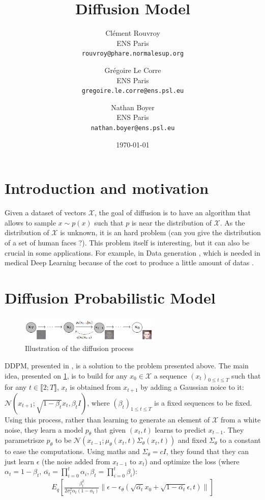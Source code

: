 \documentclass[a4paper,11pt]{article}
\title{Diffusion Model}
\author{Clément Rouvroy\\
        \small{ENS Paris}\\
        \small{\texttt{rouvroy@phare.normalesup.org}} \and
        Grégoire Le Corre\\
        \small{ENS Paris}\\
        \small{\texttt{gregoire.le.corre@ens.psl.eu}} \and
        Nathan Boyer\\
        \small{ENS Paris}\\
        \small{\texttt{nathan.boyer@ens.psl.eu}}}
\date{\today}
\begin{document}
\maketitle

\section{Introduction and motivation}

Given a dataset of vectors $\mathcal{X}$, the goal of diffusion is to have an algorithm that allows to sample $x \sim p(x)$ such that $p$  is near the distribution of $\mathcal{X}$. As the distribution of $\mathcal{X}$ is unknown, it is an hard problem (can you give the distribution of a set of human faces ?). This problem itself is interesting, but it can also be crucial in some applications. For example, in Data generation \cite{trabucco2023effectivedataaugmentationdiffusion}, which is needed in medical Deep Learning because of the cost to produce a little amount of datas \cite{tormos2024dataaugmentationdiffusionmodels}.


\section{Diffusion Probabilistic Model}

\begin{figure}[h]
    \centering
    \includegraphics[width=0.6\textwidth]{imgs/ho_diffusion_process.png}
    \caption{Illustration of the diffusion process}
    \label{img:diff}
\end{figure}
DDPM, presented in \cite{hoDenoisingDiffusionProbabilistic2020}, is a solution to the problem presented above.  The main idea, presented on \cref{img:diff}, is to build  for any $x_0 \in \mathcal{X}$ a sequence $(x_t)_{0 \leq t \leq T}$ such that for any $t \in \llbracket 2; T\rrbracket$, $x_{t}$ is obtained from $x_{t+1}$ by adding a Gaussian noice to it: $\mathcal{N}(x_{t+1}; \sqrt{1 - \beta_t} x_t, \beta_t I)$, where $(\beta_t)_{1 \leq t \leq T}$ is a fixed sequences to be fixed. Using this process, rather than learning to generate an element of $\mathcal{X}$ from a white noise, they learn a model $p_\theta$ that given $(x_t,t)$ learns to predict $x_{t-1}$. They parametrisze $p_\theta$ to be $\mathcal{N}(x_{t-1}; \mu_\theta(x_t,t)\Sigma_\theta(x_t,t))$ and fixed $\Sigma_\theta$ to a constant to ease the computations.  Using maths and $\Sigma_\theta = c I$, they found that they can just learn $\epsilon$ (the noise added from $x_{t-1}$ to $x_t$) and optimize the loss (where $\alpha_t = 1 - \beta_t$, $\bar{\alpha_t} = \prod_{i=0}^t \alpha_i, {\beta_t} = \prod_{i=0}^t \beta_i$):
\begin{align}
    E_q \left[ \frac{\beta_t^2}{2 \sigma_t^2 \alpha_t (1 - \bar{\alpha_t})} \|\epsilon - \epsilon_\theta (\sqrt{\bar{\alpha_t}} x_0 + \sqrt{1 - \bar{\alpha_t}} \epsilon, t)\|\right] \label{eq:loss1}
\end{align}
\end{document}
